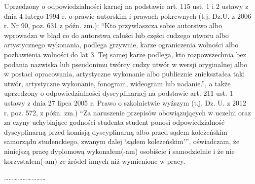 \thispagestyle{empty}
\vspace*{2cm}
\noindent Uprzedzony o odpowiedzialności karnej na podstawie art. 115 ust. 1 i 2 ustawy z dnia 4 lutego 1994 r. o prawie autorskim i prawach pokrewnych (t.j. Dz.U. z 2006 r. Nr 90, poz. 631 z późn. zm.): \enquote{Kto przywłaszcza sobie autorstwo albo wprowadza w błąd co do autorstwa całości lub części cudzego utworu albo artystycznego wykonania, podlega grzywnie, karze ograniczenia wolności albo pozbawienia wolności do lat 3. Tej samej karze podlega, kto rozpowszechnia bez podania nazwiska lub pseudonimu twórcy cudzy utwór w wersji oryginalnej albo w postaci opracowania, artystyczne wykonanie albo publicznie zniekształca taki utwór, artystyczne wykonanie, fonogram, wideogram lub nadanie.}, a także uprzedzony o odpowiedzialności dyscyplinarnej na podstawie art. 211 ust. 1 ustawy z dnia 27 lipca 2005 r. Prawo o szkolnictwie wyższym (t.j. Dz. U. z 2012 r. poz. 572, z późn. zm.) \enquote{Za naruszenie przepisów obowiązujących w uczelni oraz za czyny uchybiające godności studenta student ponosi odpowiedzialność dyscyplinarną przed komisją dyscyplinarną albo przed sądem koleżeńskim samorządu studenckiego, zwanym dalej \enquote{sądem koleżeńskim}}, oświadczam, że niniejszą pracę dyplomową wykonałem(-am) osobiście i samodzielnie i że nie korzystałem(-am) ze źródeł innych niż wymienione w pracy.

\vspace{2cm}
\begin{flushright}
………………………
\end{flushright}
\newpage
